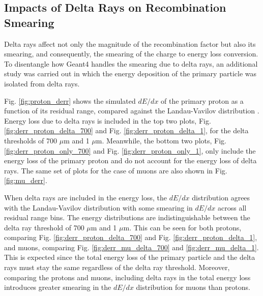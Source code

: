 \subsection{Impacts of Delta Rays on Recombination Smearing}
\label{sec:impactDeltaRaySmear}

Delta rays affect not only the magnitude of the recombination factor but also its smearing, and consequently, the smearing of the charge to energy loss conversion.
To disentangle how Geant4 handles the smearing due to delta rays, an additional study was carried out in which the energy deposition of the primary particle was isolated from delta rays. 

Fig. \ref{fig:proton_derr} shows the simulated $dE/dx$ of the primary proton as a function of its residual range, compared against the Landau-Vavilov distribution \cite{Passage}.
Energy loss due to delta rays is included in the top two plots, Fig. \ref{fig:derr_proton_delta_700} and Fig. \ref{fig:derr_proton_delta_1}, for the delta thresholds of 700 $\mu$m and 1 $\mu$m.
Meanwhile, the bottom two plots, Fig. \ref{fig:derr_proton_only_700} and Fig. \ref{fig:derr_proton_only_1}, only include the energy loss of the primary proton and do not account for the energy loss of delta rays.
The same set of plots for the case of muons are also shown in Fig. \ref{fig:mu_derr}.

When delta rays are included in the energy loss, the $dE/dx$ distribution agrees with the Landau-Vavilov distribution with some smearing in $dE/dx$ across all residual range bins.
The energy distributions are indistinguishable between the delta ray threshold of 700 $\mu$m and 1 $\mu$m.
This can be seen for both protons, comparing Fig. \ref{fig:derr_proton_delta_700} and Fig. \ref{fig:derr_proton_delta_1}, and muons, comparing Fig. \ref{fig:derr_mu_delta_700} and \ref{fig:derr_mu_delta_1}. 
This is expected since the total energy loss of the primary particle and the delta rays must stay the same regardless of the delta ray threshold.
Moreover, comparing the protons and muons, including delta rays in the total energy loss introduces greater smearing in the $dE/dx$ distribution for muons than protons.

